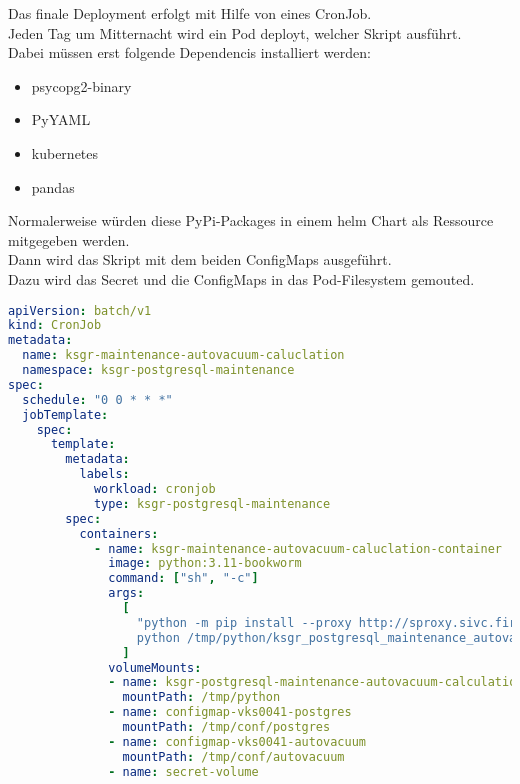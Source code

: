 \begin{flushleft}
    Das finale Deployment erfolgt mit Hilfe von eines CronJob.\\
    Jeden Tag um Mitternacht wird ein Pod deployt, welcher Skript ausführt.\\
    Dabei müssen erst folgende Dependencis installiert werden:
    \begin{itemize}
        \item psycopg2-binary
        \item PyYAML
        \item kubernetes
        \item pandas
    \end{itemize}
    Normalerweise würden diese PyPi-Packages in einem \gls{helm} Chart als Ressource mitgegeben werden.\\
    Dann wird das Skript mit dem beiden ConfigMaps ausgeführt.\\
    Dazu wird das Secret und die ConfigMaps in das Pod-Filesystem gemouted.
    \lstset{style=gra_codestyle}
    \begin{lstlisting}[language=yaml, caption=Maintenance-Tool - \Gls{AUTOVACUUM} - ksgr-maintenance-autovacuum-caluclation,captionpos=b,label={lst:maintenannce-tool-autovacuum-ksgr-maintenance-autovacuum-caluclation},breaklines=true]
apiVersion: batch/v1
kind: CronJob
metadata:
  name: ksgr-maintenance-autovacuum-caluclation
  namespace: ksgr-postgresql-maintenance
spec:
  schedule: "0 0 * * *"
  jobTemplate:
    spec:
      template:
        metadata:
          labels:
            workload: cronjob
            type: ksgr-postgresql-maintenance
        spec:
          containers:
            - name: ksgr-maintenance-autovacuum-caluclation-container
              image: python:3.11-bookworm
              command: ["sh", "-c"]
              args:
                [
                  "python -m pip install --proxy http://sproxy.sivc.first-it.ch:8080 psycopg2-binary PyYAML kubernetes pandas;
                  python /tmp/python/ksgr_postgresql_maintenance_autovacuum_calculation.py /tmp/conf/postgres/configmap-vks0041-postgres.yaml /tmp/conf/autovacuum/configmap-vks0041-autovacuum.yaml"
                ]
              volumeMounts:
              - name: ksgr-postgresql-maintenance-autovacuum-calculation
                mountPath: /tmp/python
              - name: configmap-vks0041-postgres
                mountPath: /tmp/conf/postgres
              - name: configmap-vks0041-autovacuum
                mountPath: /tmp/conf/autovacuum
              - name: secret-volume

\end{lstlisting}
\end{flushleft}

